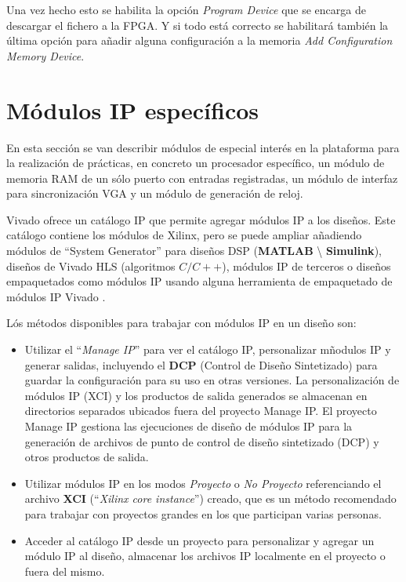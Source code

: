 Una vez hecho esto se habilita la opción \textit{Program Device} que se encarga de descargar el fichero a la 
FPGA. Y si todo está correcto se habilitará también la última opción para añadir alguna configuración a 
la memoria \textit{Add Configuration Memory Device}.

\section{Módulos IP específicos}

En esta sección se van describir módulos de especial interés en la plataforma para la realización de prácticas, en concreto un
procesador específico, un módulo de memoria RAM de un sólo puerto con entradas registradas, un módulo de interfaz para sincronización 
VGA y un módulo de generación de reloj.

Vivado ofrece un catálogo IP que permite agregar módulos IP a los diseños. Este catálogo contiene los módulos de Xilinx, pero se puede ampliar añadiendo módulos de ``System 
Generator'' para diseños DSP (\textbf{MATLAB} \textbackslash{} \textbf{Simulink}), diseños de Vivado HLS (algoritmos 
$C / C++$), módulos IP de terceros o diseños empaquetados como módulos IP usando alguna herramienta de empaquetado de módulos IP Vivado \cite{ip}.

Lós métodos disponibles para trabajar con módulos IP en un diseño son:

\begin{itemize}
    \item Utilizar el ``\textit{Manage IP}'' para ver el catálogo IP, personalizar mñodulos IP y generar salidas, incluyendo el \textbf{DCP} 
    (Control de Diseño Sintetizado) para guardar la configuración para su uso en otras versiones. La personalización de módulos IP (XCI) y 
    los productos de salida generados se almacenan en directorios separados ubicados fuera del proyecto Manage IP. El proyecto 
    Manage IP gestiona las ejecuciones de diseño de módulos IP para la generación de archivos de punto de control de diseño sintetizado 
    (DCP) y otros productos de salida.
    \item Utilizar módulos IP en los modos \textit{Proyecto} o \textit{No Proyecto} referenciando el archivo \textbf{XCI} 
    (``\textit{Xilinx core instance}'') creado, que es un método recomendado para trabajar con proyectos 
    grandes en los que participan varias personas.
    \item Acceder al catálogo IP desde un proyecto para personalizar y agregar un módulo IP al diseño, almacenar 
    los archivos IP localmente en el proyecto o fuera del mismo.
\end{itemize}

